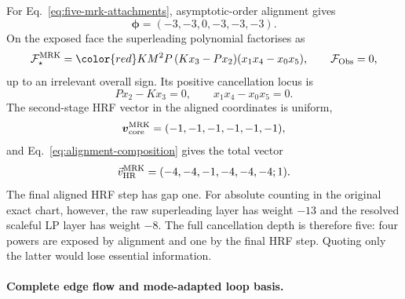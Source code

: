 \documentclass[a4paper,11pt]{article}
\newcommand{\FObs}{\mathcal F_{\rm Obs}}
\newcommand{\vHR}{\vec v_{\rm HR}}
\newcommand{\SLcolour}[1]{{\color{red}#1}}
\begin{document}
For Eq.~\eqref{eq:five-mrk-attachments}, asymptotic-order alignment gives
\begin{equation}
 \boldsymbol\phi=(-3,-3,0,-3,-3,-3).
 \label{eq:five-mrk-alignment-vector}
\end{equation}
On the exposed face the superleading polynomial factorises as
\begin{equation}
 \mathcal F_\star^{\rm MRK}
 =\SLcolour{KM^2P\,(Kx_3-Px_2)(x_1x_4-x_0x_5)},
 \qquad \FObs=0,
 \label{eq:five-mrk-aligned-polynomial}
\end{equation}
up to an irrelevant overall sign.  Its positive cancellation locus is
\begin{equation}
 Px_2-Kx_3=0,\qquad x_1x_4-x_0x_5=0.
 \label{eq:five-mrk-cancellation-locus}
\end{equation}
The second-stage HRF vector in the aligned coordinates is uniform,
\begin{equation}
 \boldsymbol v_{\rm core}^{\rm MRK}=(-1,-1,-1,-1,-1,-1),
 \label{eq:five-mrk-second-vector}
\end{equation}
and Eq.~\eqref{eq:alignment-composition} gives the total vector
\begin{equation}
 \vHR^{\rm MRK}=(-4,-4,-1,-4,-4,-4;1).
 \label{eq:five-mrk-total-vector}
\end{equation}
The final aligned HRF step has gap one.  For absolute counting in the
original exact chart, however, the raw superleading layer has weight \(-13\)
and the resolved scaleful LP layer has weight \(-8\).  The full cancellation
depth is therefore five: four powers are exposed by alignment and one by the
final HRF step.  Quoting only the latter would lose essential information.

\paragraph{Complete edge flow and mode-adapted loop basis.}
\end{document}
